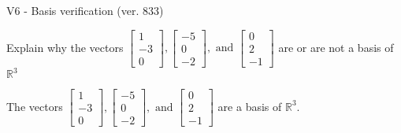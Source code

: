 \begin{exercise}
  \begin{exerciseTitle}V6 - Basis verification (ver. 833)\end{exerciseTitle}
  \begin{exerciseStatement}
    Explain why the vectors \(\left[\begin{array}{r}
1 \\
-3 \\
0
\end{array}\right] , \left[\begin{array}{r}
-5 \\
0 \\
-2
\end{array}\right] , \text{ and } \left[\begin{array}{r}
0 \\
2 \\
-1
\end{array}\right]\) are or are not a basis of \(\mathbb{R}^3\)	


  \end{exerciseStatement}
  \begin{exerciseAnswer}
   The vectors \(\left[\begin{array}{r}
1 \\
-3 \\
0
\end{array}\right] , \left[\begin{array}{r}
-5 \\
0 \\
-2
\end{array}\right] , \text{ and } \left[\begin{array}{r}
0 \\
2 \\
-1
\end{array}\right]\) 
  	 are  a basis of \(\mathbb{R}^3\).
  


  \end{exerciseAnswer}
\end{exercise}
